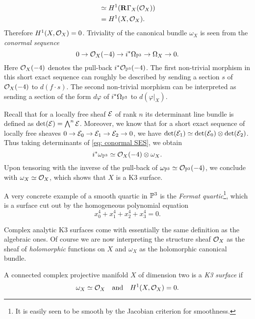 \begin{example}
\begin{align*}
        &\simeq H^1(\mathbf{R}^{}\Gamma_X({\mathcal{O}_{X}})) \\
        & = H^{1}(X, {\mathcal{O}_{X}}).
    \end{align*}
    Therefore $H^{1}(X, {\mathcal{O}_{X}}) = 0$. Triviality of the canonical bundle $\omega_X$ is seen from the \emph{conormal sequence}
    \begin{equation}
        \label{eq: conormal SES}
        0 \to {\mathcal{O}_{X}}(-4) \to i^*\Omega_{\mathbb P^3} \to \Omega_X \to 0.
    \end{equation}
    Here ${\mathcal{O}_{X}}(-4)$ denotes the pull-back $i^*{\mathcal{O}_{\mathbb P^3}}(-4)$. The first non-trivial morphism in this short exact sequence can roughly be described by sending a section $s$ of ${\mathcal{O}_{X}}(-4)$ to $d(f \cdot s)$. The second non-trivial morphism can be interpreted as sending a section of the form $d\varphi$ of $i^*\Omega_{\mathbb P^3}$ to $d(\varphi|_X)$. 

    Recall that for a locally free sheaf $\mathcal E$ of rank $n$ its determinant line bundle is defined as $\det(\mathcal E) = \bigwedge^n \mathcal E$. Moreover, we know that for a short exact sequence of locally free sheaves $0 \to \mathcal E_0 \to \mathcal E_1 \to \mathcal E_2 \to 0$, we have $\det(\mathcal E_1) \simeq \det(\mathcal E_0) \otimes \det(\mathcal E_2)$. Thus taking determinants of \eqref{eq: conormal SES}, we obtain
    \[
        i^*\omega_{\mathbb P^3} \simeq {\mathcal{O}_{X}}(-4) \otimes \omega_X.
    \]
    Upon tensoring with the inverse of the pull-back of $\omega_{\mathbb P^3} \simeq {\mathcal{O}_{\mathbb P^3}}(-4)$, we conclude with $\omega_X \simeq {\mathcal{O}_{X}}$, which shows that $X$ is a K3 surface.
\end{example}

\begin{example}        
    A very concrete example of a smooth quartic in $\mathbb P^3$ is the \emph{Fermat quartic}\footnote{It is easily seen to be smooth by the Jacobian criterion for smoothness.}, which is a surface cut out by the homogeneous polynomial equation 
    \[
        x_0^4 + x_1^4 + x_2^4 + x_3^4 = 0.
    \]
\end{example}

Complex analytic K3 surfaces come with essentially the same definition as the algebraic ones. Of course we are now interpreting the structure sheaf ${\mathcal{O}_{X}}$ as the sheaf of \emph{holomorphic} functions on $X$ and $\omega_X$ as the holomorphic canonical bundle.  

\begin{definition}
    \label{Definition of complex K3}
    A connected complex projective manifold $X$ of dimension two is a \emph{K3 surface} if  
     \[
        \omega_X \simeq {\mathcal{O}_{X}} \quad \text{and} \quad H^{1}(X, {\mathcal{O}_{X}}) = 0.
    \]
\end{definition}

